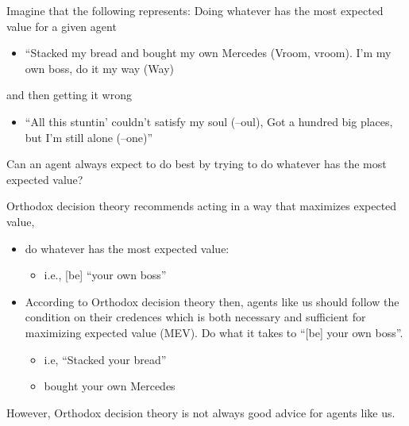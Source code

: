 \documentclass[
  letterpaper,
  DIV=11,
  numbers=noendperiod]{scrartcl}
\providecommand{\tightlist}{%
  \setlength{\itemsep}{0pt}\setlength{\parskip}{0pt}}
\begin{document}
Imagine that the following represents: Doing whatever has the most
expected value for a given agent

\begin{itemize}
\tightlist
\item
  ``Stacked my bread and bought my own Mercedes (Vroom, vroom). I'm my
  own boss, do it my way (Way)
\end{itemize}

and then getting it wrong

\begin{itemize}
\tightlist
\item
  ``All this stuntin' couldn't satisfy my soul (--oul), Got a hundred
  big places, but I'm still alone (--one)''
\end{itemize}

Can an agent always expect to do best by trying to do whatever has the
most expected value?

Orthodox decision theory recommends acting in a way that maximizes
expected value,

\begin{itemize}
\tightlist
\item
  do whatever has the most expected value:

  \begin{itemize}
  \tightlist
  \item
    i.e., {[}be{]} ``your own boss''
  \end{itemize}
\item
  According to Orthodox decision theory then, agents like us should
  follow the condition on their credences which is both necessary and
  sufficient for maximizing expected value (MEV). Do what it takes to
  ``{[}be{]} your own boss''.

  \begin{itemize}
  \tightlist
  \item
    i.e, ``Stacked your bread''
  \item
    bought your own Mercedes
  \end{itemize}
\end{itemize}

However, Orthodox decision theory is not always good advice for agents
like us.
\end{document}
